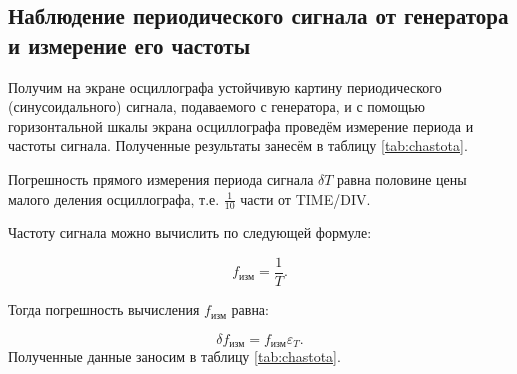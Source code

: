 \documentclass[a4paper,12pt]{article} %
\begin{document}
\subsection{Наблюдение периодического сигнала от генератора и измерение его частоты}

Получим на экране осциллографа устойчивую картину периодического (синусоидального) сигнала, подаваемого с генератора, и с помощью горизонтальной шкалы экрана осциллографа проведём измерение периода и частоты сигнала. Полученные результаты занесём в таблицу \ref{tab:chastota}.


Погрешность прямого измерения периода сигнала $ \delta T $ равна половине цены малого деления осциллографа, т.е. $ \frac{1}{10} $ части от TIME/DIV.

Частоту сигнала можно вычислить по следующей формуле:

\begin{equation}
f_\text{изм} = \frac{1}{T}.
\end{equation}

Тогда погрешность вычисления $ f_\text{изм} $ равна:

\begin{equation}
\delta f_\text{изм} = f_\text{изм}\varepsilon_T.
\end{equation}
Полученные данные заносим в таблицу \ref{tab:chastota}.
\end{document}
